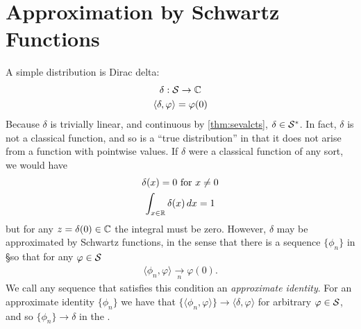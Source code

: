   \section{Approximation by Schwartz Functions}
    A simple distribution is Dirac delta:
    \begin{gather*}
      \delta:\S\rightarrow\C\\
      \langle\delta,\varphi\rangle = \varphi(0)
    \end{gather*}
    Because $\delta$ is trivially linear, and continuous by \cref{thm:sevalcts}, $\delta\in\SS$.
    In fact, $\delta$ is not a classical function, and so is a ``true distribution'' in that it does not arise from a function with pointwise values.
    If $\delta$ were a classical function of any sort, we would have
    \begin{gather*}
      \delta(x)=0\text{ for }x\ne0\\
      \int_{x\in\R} \delta(x)\,dx = 1
    \end{gather*}
    but for any $z=\delta(0)\in\C$ the integral must be zero.
    However, $\delta$ may be approximated by Schwartz functions, in the sense that there is a sequence $\{\phi_n\}$ in \S so that for any $\varphi\in\S$
    \begin{align*}
      \langle \phi_n, \varphi\rangle \underset{n}{\longrightarrow} \varphi(0)\text{.}
    \end{align*}
    We call any sequence that satisfies this condition an \emph{approximate identity}.
    For an approximate identity $\{\phi_n\}$ we have that $\{\langle\phi_n,\varphi\rangle\}\rightarrow\langle\delta,\varphi\rangle$ for arbitrary $\varphi\in\S$, and so $\{\phi_n\}\rightarrow\delta$ in the \ws.

